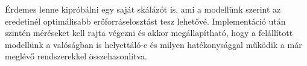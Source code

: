 Érdemes lenne kipróbálni egy saját skálázót is, ami a modellünk szerint az eredetinél optimálisabb erőforráselosztást tesz lehetővé. Implementáció után szintén méréseket kell rajta végezni és akkor megállapítható, hogy a felállított modellünk a valóságban is helyettáló-e és milyen hatékonysággal működik a már meglévő rendszerekkel összehasonlítva. 


